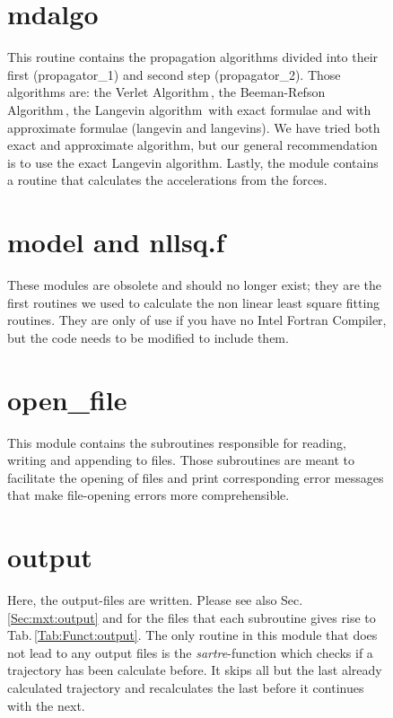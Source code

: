 \documentclass[twoside, 11pt, titlepage, captions=nooneline, a4paper, headsepline]{scrbook}%
\newcommand{\9}{\mathrm}
\newcommand{\0}{\,\mathrm}
\begin{document}
\begin{figure}[b!]
\section{mdalgo}
This routine contains the propagation algorithms divided into their first (propagator\_1) and second step (propagator\_2). Those algorithms are: the Verlet Algorithm\,\cite{allen1989}, the Beeman-Refson Algorithm\,\cite{refson1985}, the Langevin algorithm\,\cite{allen1989} with exact formulae and with approximate formulae (langevin and langevins). We have tried both exact and approximate algorithm, but our general recommendation is to use the exact Langevin algorithm. Lastly, the module contains a routine that calculates the accelerations from the forces.

\section{model and nllsq.f}
These modules are obsolete and should no longer exist; they are the first routines we used to calculate the non linear least square fitting routines.
They are only of use if you have no Intel Fortran Compiler, but the code needs to be modified to include them.
\section{open\_file}
This module contains the subroutines responsible for reading, writing and appending to files. Those subroutines are meant to facilitate the opening of files and print corresponding error messages that make file-opening errors more comprehensible.

\section{output}
Here, the output-files are written. Please see also Sec.\,\ref{Sec:mxt:output} and for the files that each subroutine gives rise to Tab.\,\ref{Tab:Funct:output}. The only routine in this module that does not lead to any output files is the \textit{sartre}-function which checks if a trajectory has been calculate before. It skips all but the last already calculated trajectory and recalculates the last before it continues with the next.


\end{figure}
\end{document}

